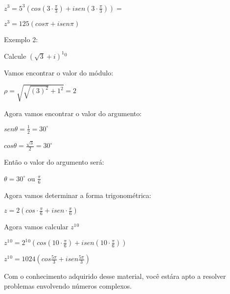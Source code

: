 \documentclass[]{article}
\begin{document}
\begin{large}
\begin{flushleft}
\begin{center}
    $z^3=5^3(cos(3\cdot \frac{\pi}{3}) + isen(3\cdot \frac{\pi}{3}))=$
    
    $z^3=125(cos\pi + isen\pi)$ \vspace{.3cm}
\end{center}

Exemplo 2: \vspace{.3cm}

Calcule $(\sqrt{3}+i)^1{}^0$ \vspace{.3cm}

Vamos encontrar o valor do módulo:

\begin{center}
    $\rho=\sqrt{\sqrt{(3)^2}+1^2} = 2$ \vspace{.3cm}
\end{center}

Agora vamos encontrar o valor do argumento: \vspace{.3cm}

\begin{center}
    $sen\theta=\frac{1}{2}=30^\circ$ \vspace{.3cm}
    
    $cos\theta=\frac{\sqrt{3}}{2}=30^\circ$ \vspace{.3cm}
\end{center}

Então o valor do argumento será: \vspace{.3cm}

\begin{center}
    $\theta=30^\circ$ ou $\frac{\pi}{6}$
\end{center}

Agora vamos determinar a forma trigonométrica: \vspace{.cm}

\begin{center}
    $z=2(cos \cdot \frac{\pi}{6} + isen \cdot \frac{\pi}{6})$
\end{center}

Agora vamos calcular $z^1{}^0$ \vspace{.3cm}

\begin{center}
    $z^1{}^0=2^1{}^0(cos(10 \cdot \frac{\pi}{6}) + isen(10 \cdot \frac{\pi}{6}))$ \vspace{.3cm}
    
    $z^1{}^0=1024(cos\frac{5\pi}{3}+isen\frac{5\pi}{3})$ \vspace{.3cm}
\end{center}


Com o conhecimento adquirido desse material, você estára apto a resolver problemas envolvendo números complexos.

\end{flushleft}
\end{large}
\end{document}

